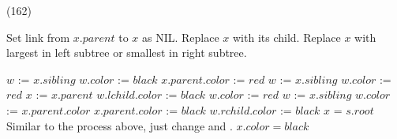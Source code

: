 \begin{theorem}{(162)}
\begin{itemize}
\begin{algorithm}[H]
\begin{algorithmic}[1]
                        \State Set link from $x.parent$ to $x$ as NIL.
                        \State Replace $x$ with its child. 
                    \Else {}
                        \State Replace $x$ with largest in left subtree or smallest in right subtree.
                    \EndIf
                        \State {}
                    \EndIf
                \EndFunction
            \end{algorithmic}
        \end{algorithm}
        \begin{algorithm}[H]
            \begin{algorithmic}[1]
                            \State $w$ := $x.sibling$
                                \State $w.color$ := $black$
                                \State $x.parent.color$ := $red$
                                \State {}
                                \State $w$ := $x.sibling$
                                \State $w.color$ := $red$
                                \State $x$ := $x.parent$
                                \State $w.lchild.color$ := $black$
                                \State $w.color$ := $red$
                                \State {}
                                \State $w$ := $x.sibling$
                            \Else
                                \State $w.color$ := $x.parent.color$
                                \State $x.parent.color$ := $black$
                                \State $w.rchild.color$ := $black$
                                \State {}
                                \State $x$ = $s.root$
                            \EndIf
                        \Else
                            \State Similar to the process above, just change  and .
                        \EndIf
                    \EndWhile
                    \State $x.color = black$
                \EndFunction
            \end{algorithmic}
        \end{algorithm}
    \end{itemize}
\end{theorem}
    
